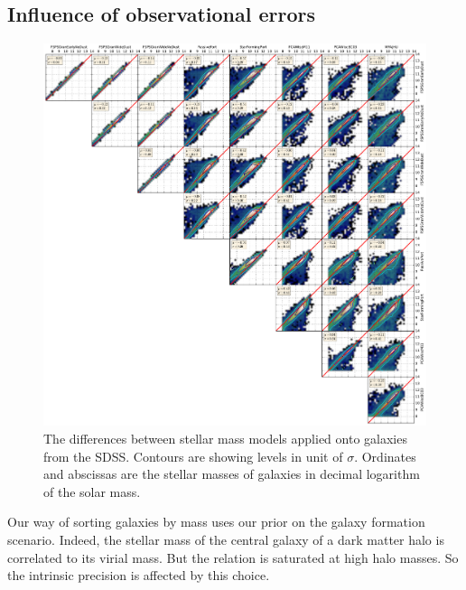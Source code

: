 \subsection{Influence of observational errors}

\begin{figure}[htbp]
    \centering
    \includegraphics[width=\linewidth]{figures/maggie/stellar_mass_models.pdf}
    \caption{The differences between stellar mass models applied onto galaxies
    from the SDSS\@. Contours are showing levels in unit of $\sigma$. Ordinates
and abscissas are the stellar masses of galaxies in decimal logarithm of the
solar mass.\label{fig:stellar_mass_models}}
\end{figure}

Our way of sorting galaxies by mass uses our prior on the galaxy formation
scenario. Indeed, the stellar mass of the central galaxy of a dark matter halo
is correlated to its virial mass. But the relation is saturated at high halo
masses. So the intrinsic precision is affected by this choice.


